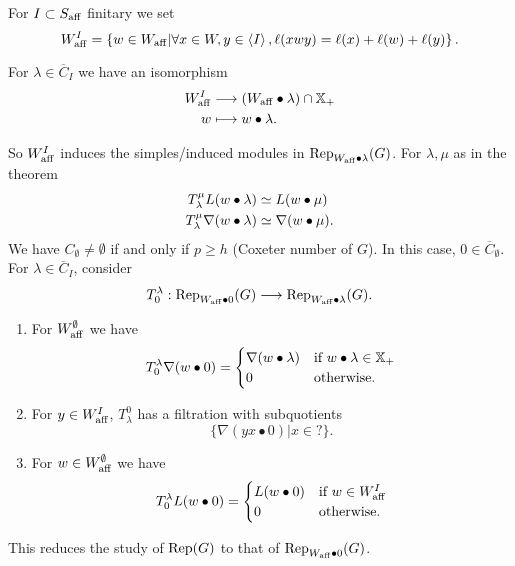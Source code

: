 		For $I\subset S_{\mathrm{aff}}$ finitary we set
		\[
			W_{\mathrm{aff}}^{I} = \left\{ w\in W_{\mathrm{aff}} \middle| \forall x\in W,y\in \left<I \right>, \ell(xwy)
			= \ell(x)+\ell(w)+\ell(y) \right\} .
		\]
		\begin{fact}
			For $\lambda\in \overline{C}_I$ we have an isomorphism
			\begin{align*}
				W_{\mathrm{aff}}^{I} &\longrightarrow (W_{\mathrm{aff}}\bullet\lambda)\cap \mathbb{X}_+ \\
				w &\longmapsto w\bullet\lambda.
			\end{align*}
		\end{fact}
		So $W_{\mathrm{aff}}^{I}$ induces the simples/induced modules in $\operatorname{Rep}_{W_{\mathrm{aff}}\bullet\lambda}(G)$.
		For $\lambda,\mu$ as in the theorem
		\begin{align*}
			T_{\lambda}^{\mu}L(w\bullet\lambda) &\simeq L(w\bullet\mu) \\
			T_{\lambda}^{\mu}\nabla(w\bullet\lambda) &\simeq \nabla(w\bullet\mu).
		\end{align*}
		We have $C_{\emptyset}\neq \emptyset$ if and only if $p\ge h$ (Coxeter number of $G$).
		In this case, $0\in \overline{C}_{\emptyset}$. For $\lambda\in \overline{C}_I$, consider
		\[
			T_0^{\lambda}:\Rep_{W\aff\bullet 0}(G) \to \Rep_{W\aff\bullet\lambda}(G).
		\]
		\begin{proposition}\leavevmode
			\begin{enumerate}[(1)]
				\item For $W_{\mathrm{aff}}^{\emptyset}$ we have
					\[
						T_0^{\lambda}\nabla(w\bullet 0) =
						\begin{cases}
							\nabla(w\bullet\lambda) & \text{if }w\bullet\lambda\in \mathbb{X}_+ \\
							0 & \text{otherwise}.
						\end{cases}
					\]
				\item For $y\in W_{\mathrm{aff}}^{I}$, $T_\lambda^{0}$ has a filtration with subquotients
					\[
						\{\nabla(yx\bullet 0)| x\in ?\} .
					\]
				\item For $w\in W_{\mathrm{aff}}^{\emptyset}$ we have
					\[
						T_0^{\lambda}L(w\bullet 0) =
						\begin{cases}
							L(w\bullet 0) & \text{if }w\in W_{\mathrm{aff}}^{I} \\
							0 & \text{otherwise}.
						\end{cases}
					\]
			\end{enumerate}
		\end{proposition}
		This reduces the study of $\operatorname{Rep}(G)$ to that of $\operatorname{Rep}_{W_{\mathrm{aff}}\bullet 0}(G)$.

		
